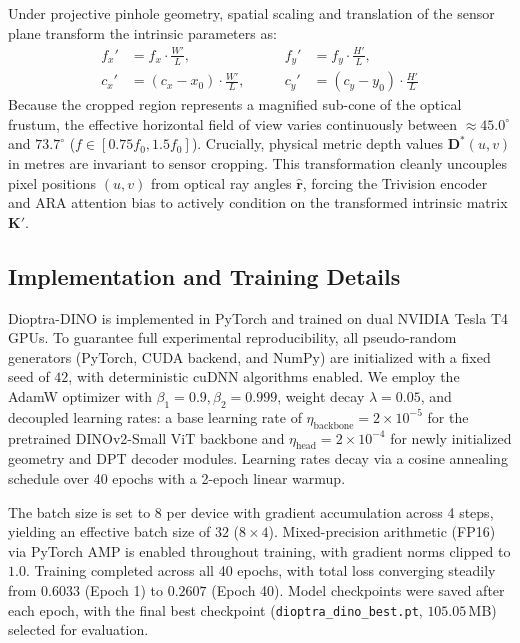 Under projective pinhole geometry, spatial scaling and translation of the sensor plane transform the intrinsic parameters as:
\begin{equation}
\begin{aligned}
    f_x' &= f_x \cdot \frac{W'}{L}, \qquad &f_y' &= f_y \cdot \frac{H'}{L}, \\
    c_x' &= (c_x - x_0) \cdot \frac{W'}{L}, \qquad &c_y' &= (c_y - y_0) \cdot \frac{H'}{L}
\end{aligned}
\label{eq:pinhole_transform}
\end{equation}
Because the cropped region represents a magnified sub-cone of the optical frustum, the effective horizontal field of view varies continuously between $\approx 45.0^\circ$ and $73.7^\circ$ ($f \in [0.75f_0, 1.5f_0]$). Crucially, physical metric depth values $\mathbf{D}^*(u, v)$ in metres are invariant to sensor cropping. This transformation cleanly uncouples pixel positions $(u, v)$ from optical ray angles $\hat{\mathbf{r}}$, forcing the Trivision encoder and ARA attention bias to actively condition on the transformed intrinsic matrix $\mathbf{K}'$.

\subsection{Implementation and Training Details}
\label{sec:training_details}
Dioptra-DINO is implemented in PyTorch and trained on dual NVIDIA Tesla T4 GPUs. To guarantee full experimental reproducibility, all pseudo-random generators (PyTorch, CUDA backend, and NumPy) are initialized with a fixed seed of $42$, with deterministic cuDNN algorithms enabled. We employ the AdamW optimizer with $\beta_1 = 0.9, \beta_2 = 0.999$, weight decay $\lambda = 0.05$, and decoupled learning rates: a base learning rate of $\eta_{\text{backbone}} = 2 \times 10^{-5}$ for the pretrained DINOv2-Small ViT backbone and $\eta_{\text{head}} = 2 \times 10^{-4}$ for newly initialized geometry and DPT decoder modules. Learning rates decay via a cosine annealing schedule over 40 epochs with a 2-epoch linear warmup. 

The batch size is set to 8 per device with gradient accumulation across 4 steps, yielding an effective batch size of $32$ ($8 \times 4$). Mixed-precision arithmetic (FP16) via PyTorch AMP is enabled throughout training, with gradient norms clipped to $1.0$. Training completed across all 40 epochs, with total loss converging steadily from $0.6033$ (Epoch 1) to $0.2607$ (Epoch 40). Model checkpoints were saved after each epoch, with the final best checkpoint (\texttt{dioptra\_dino\_best.pt}, $105.05$\,MB) selected for evaluation.

